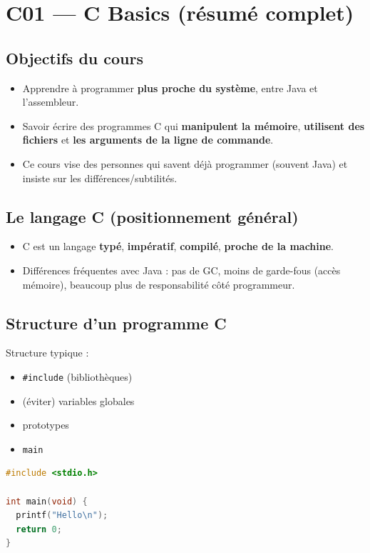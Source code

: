 \section{C01 — C Basics (résumé complet)}

\subsection{Objectifs du cours}
\begin{itemize}
  \item Apprendre à programmer \textbf{plus proche du système}, entre Java et l’assembleur.
  \item Savoir écrire des programmes C qui \textbf{manipulent la mémoire}, \textbf{utilisent des fichiers} et \textbf{les arguments de la ligne de commande}. 
  \item Ce cours vise des personnes qui savent déjà programmer (souvent Java) et insiste sur les différences/subtilités.
\end{itemize}

\subsection{Le langage C (positionnement général)}
\begin{itemize}
  \item C est un langage \textbf{typé}, \textbf{impératif}, \textbf{compilé}, \textbf{proche de la machine}.
  \item Différences fréquentes avec Java : pas de GC, moins de garde-fous (accès mémoire), beaucoup plus de responsabilité côté programmeur.
\end{itemize}

\subsection{Structure d’un programme C}
Structure typique :
\begin{itemize}
  \item \texttt{\#include} (bibliothèques)
  \item (éviter) variables globales
  \item prototypes
  \item \texttt{main}
\end{itemize}

\begin{lstlisting}[language=C]
#include <stdio.h>

int main(void) {
  printf("Hello\n");
  return 0;
}
\end{lstlisting}

